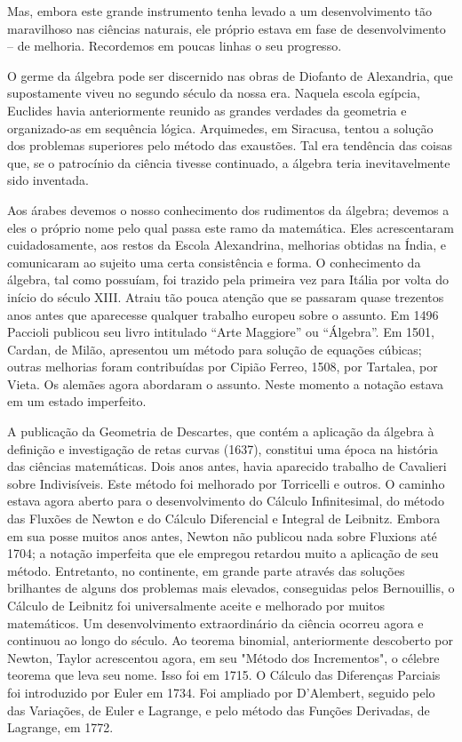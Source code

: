 \documentclass[11pt,a5paper,twoside,openany]{book}
\begin{document}
Mas, embora este grande instrumento tenha levado a um desenvolvimento tão maravilhoso nas ciências naturais, ele próprio estava em fase de desenvolvimento – de melhoria. Recordemos em poucas linhas o seu progresso.

O germe da álgebra pode ser discernido nas obras de Diofanto de Alexandria, que supostamente viveu no segundo século da nossa era. Naquela escola egípcia, Euclides havia anteriormente reunido as grandes verdades da geometria e organizado-as em sequência lógica. Arquimedes, em Siracusa, tentou a solução dos problemas superiores pelo método das exaustões. Tal era tendência das coisas que, se o patrocínio da ciência tivesse continuado, a álgebra teria inevitavelmente sido inventada.

Aos árabes devemos o nosso conhecimento dos rudimentos da álgebra; devemos a eles o próprio nome pelo qual passa este ramo da matemática. Eles acrescentaram cuidadosamente, aos restos da Escola Alexandrina, melhorias obtidas na Índia, e comunicaram ao sujeito uma certa consistência e forma. O conhecimento da álgebra, tal como possuíam, foi trazido pela primeira vez para Itália por volta do início do século XIII. Atraiu tão pouca atenção que se passaram quase trezentos anos antes que aparecesse qualquer trabalho europeu sobre o assunto. Em 1496 Paccioli publicou seu livro intitulado “Arte Maggiore” ou “Álgebra”. Em 1501, Cardan, de Milão, apresentou um método para solução de equações cúbicas; outras melhorias foram contribuídas por Cipião Ferreo, 1508, por Tartalea, por Vieta. Os alemães agora abordaram o assunto. Neste momento a notação estava em um estado imperfeito.

A publicação da Geometria de Descartes, que contém a aplicação da álgebra à definição e investigação de retas curvas (1637), constitui uma época na história das ciências matemáticas. Dois anos antes, havia aparecido trabalho de Cavalieri sobre Indivisíveis. Este método foi melhorado por Torricelli e outros. O caminho estava agora aberto para o desenvolvimento do Cálculo Infinitesimal, do método das Fluxões de Newton e do Cálculo Diferencial e Integral de Leibnitz. Embora em sua posse muitos anos antes, Newton não publicou nada sobre Fluxions até 1704; a notação imperfeita que ele empregou retardou muito a aplicação de seu método. Entretanto, no continente, em grande parte através das soluções brilhantes de alguns dos problemas mais elevados, conseguidas pelos Bernouillis, o Cálculo de Leibnitz foi universalmente aceite e melhorado por muitos matemáticos. Um desenvolvimento extraordinário da ciência ocorreu agora e continuou ao longo do século. Ao teorema binomial, anteriormente descoberto por Newton, Taylor acrescentou agora, em seu "Método dos Incrementos", o célebre teorema que leva seu nome. Isso foi em 1715. O Cálculo das Diferenças Parciais foi introduzido por Euler em 1734. Foi ampliado por D'Alembert, seguido pelo das Variações, de Euler e Lagrange, e pelo método das Funções Derivadas, de Lagrange, em 1772.
\end{document}
